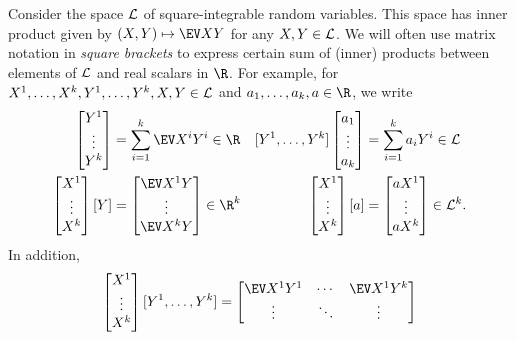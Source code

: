 \documentclass[main.tex]{subfiles}
\begin{document}
\begin{defn}
\label{defn:LsqZ}
Consider the space $\mathcal{L}$ of square-integrable random variables.
This space has inner product given by $(X, Y) \mapsto \EV XY$ for any $X, Y \in \mathcal{L}$.
We will often use matrix notation in \emph{square brackets} to express certain sum of (inner) products between elements of $\mathcal{L}$ and real scalars in $\R$.
For example, for $X^1, \ldots, X^k, Y^1, \ldots, Y^k, X, Y \in \mathcal{L}$ and $a_1, \ldots, a_k, a \in \R$, we write
\begin{align*}
[X^1, \ldots, X^k]
\begin{bmatrix}
Y^1\\
\vdots\\
Y^k
\end{bmatrix}
  &=
    \sum_{i=1}^k \EV X^i Y^i
      \in \R
    &
[Y^1, \ldots, Y^k]
\begin{bmatrix}
a_1\\
\vdots\\
a_k
\end{bmatrix}
  &=
    \sum_{i=1}^k a_i Y^i \in \LsqZ
    \\
\begin{bmatrix}
X^1\\
\vdots\\
X^k
\end{bmatrix}
[Y]
  &=
    \begin{bmatrix}
    \EV X^1 Y\\
    \vdots\\
    \EV X^k Y
    \end{bmatrix}
      \in \R^{k}
    &
\begin{bmatrix}
X^1\\
\vdots\\
X^k
\end{bmatrix}
[a]
  &=
    \begin{bmatrix}
    aX^1\\
    \vdots\\
    aX^k
    \end{bmatrix}
    \in \LsqZ^k.
\end{align*}
In addition,
\begin{align*}
  \begin{bmatrix}
  X^1\\
  \vdots\\
  X^k
  \end{bmatrix}
  [Y^1, \ldots, Y^k]
  =
  \begin{bmatrix}
    \EV X^1 Y^1 & \cdots & \EV X^1 Y^k\\
    \vdots & \ddots & \vdots\\

\end{bmatrix}
\end{align*}
\end{defn}
\end{document}
